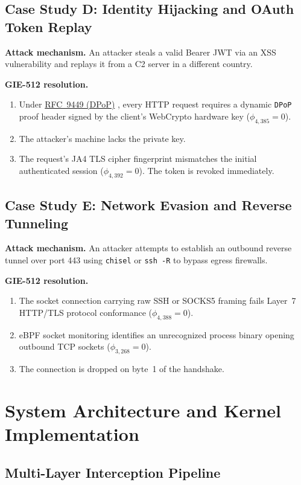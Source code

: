 \documentclass{portalciencia}
\newcommand{\linkrfcdpop}{%
  \href{https://www.rfc-editor.org/rfc/rfc9449}{RFC~9449 (DPoP)}%
}
\theoremstyle{plain}
\theoremstyle{definition}
\begin{document}
\subsection{Case Study D: Identity Hijacking and OAuth Token Replay}

\textbf{Attack mechanism.} An attacker steals a valid Bearer JWT via an XSS vulnerability and replays it from a C2 server in a different country.

\textbf{GIE-512 resolution.}
\begin{enumerate}
  \item Under \linkrfcdpop, every HTTP request requires a dynamic \texttt{DPoP} proof header signed by the client's WebCrypto hardware key ($\phi_{4,385} = 0$).
  \item The attacker's machine lacks the private key.
  \item The request's JA4 TLS cipher fingerprint mismatches the initial authenticated session ($\phi_{4,392} = 0$). The token is revoked immediately.
\end{enumerate}

\subsection{Case Study E: Network Evasion and Reverse Tunneling}

\textbf{Attack mechanism.} An attacker attempts to establish an outbound reverse tunnel over port 443 using \texttt{chisel} or \texttt{ssh -R} to bypass egress firewalls.

\textbf{GIE-512 resolution.}
\begin{enumerate}
  \item The socket connection carrying raw SSH or SOCKS5 framing fails Layer~7 HTTP/TLS protocol conformance ($\phi_{4,388} = 0$).
  \item eBPF socket monitoring identifies an unrecognized process binary opening outbound TCP sockets ($\phi_{3,268} = 0$).
  \item The connection is dropped on byte~1 of the handshake.
\end{enumerate}

\section{System Architecture and Kernel Implementation}

\subsection{Multi-Layer Interception Pipeline}
\end{document}
